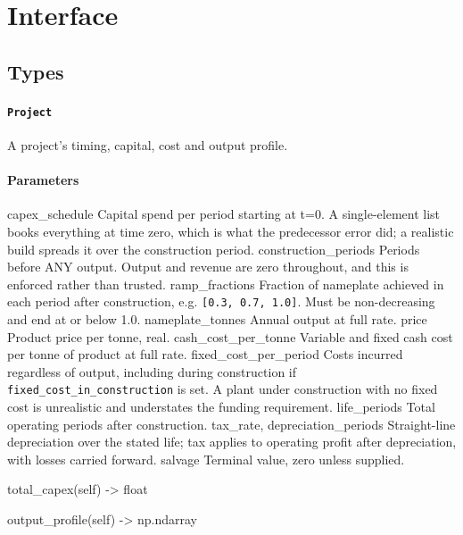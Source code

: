 \documentclass[10pt,a4paper,twoside]{report}
\begin{document}
\section{Interface}

\subsection*{Types}

\paragraph{\texttt{Project}}

A project's timing, capital, cost and output profile.

\paragraph*{Parameters}

capex\_schedule Capital spend per period starting at t=0. A single-element list books everything at time zero, which is what the predecessor error did; a realistic build spreads it over the construction period. construction\_periods Periods before ANY output. Output and revenue are zero throughout, and this is enforced rather than trusted. ramp\_fractions Fraction of nameplate achieved in each period after construction, e.g. \texttt{[0.3, 0.7, 1.0]}. Must be non-decreasing and end at or below 1.0. nameplate\_tonnes Annual output at full rate. price Product price per tonne, real. cash\_cost\_per\_tonne Variable and fixed cash cost per tonne of product at full rate. fixed\_cost\_per\_period Costs incurred regardless of output, including during construction if \texttt{fixed\_cost\_in\_construction} is set. A plant under construction with no fixed cost is unrealistic and understates the funding requirement. life\_periods Total operating periods after construction. tax\_rate, depreciation\_periods Straight-line depreciation over the stated life; tax applies to operating profit after depreciation, with losses carried forward. salvage Terminal value, zero unless supplied.

\begin{verbatimsmall}
total_capex(self) -> float
\end{verbatimsmall}

\begin{verbatimsmall}
output_profile(self) -> np.ndarray
\end{verbatimsmall}
\end{document}
